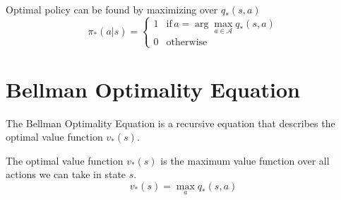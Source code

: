 Optimal policy can be found by maximizing over $q_*(s,a)$
\[
    \pi_{*}(a|s) =
    \begin{cases}
        1 & \text{if}\,a=\arg\max_{a\in\mathcal{A}}q_*(s,a) \\
        0 & \text{otherwise}
    \end{cases}
\]


\section{Bellman Optimality Equation}\label{sec:bellman-optimality-equation}
The Bellman Optimality Equation is a recursive equation that describes the optimal value function $v_*(s)$.

\newcommand{\tikzAngleOfLine}{\tikz@AngleOfLine}
\def\tikz@AngleOfLine(#1)(#2)#3{%
    \pgfmathanglebetweenpoints{%
        \pgfpointanchor{#1}{center}}{%
        \pgfpointanchor{#2}{center}}
    \pgfmathsetmacro{#3}{\pgfmathresult}%
}


\begin{definition}
    The optimal value function $v_*(s)$ is the maximum value function over all actions
    we can take in state $s$.
    \[
        v_*(s) = \max_{a}q_*(s,a)
    \]
\end{definition}
\begin{center}
\end{center}


